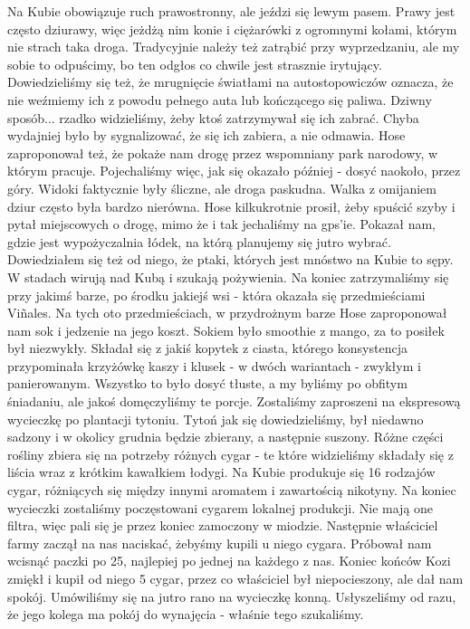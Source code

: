 Na Kubie obowiązuje ruch prawostronny, ale jeździ się lewym pasem.
 Prawy jest często dziurawy, więc jeżdżą nim konie i ciężarówki z ogromnymi kołami, którym nie strach taka droga.
Tradycyjnie należy też zatrąbić przy wyprzedzaniu, ale my sobie to odpuścimy, bo ten odgłos co chwile jest strasznie irytujący.
Dowiedzieliśmy się też, że mrugnięcie światłami na autostopowiczów oznacza, że nie weźmiemy ich z powodu pełnego auta lub kończącego się paliwa.
Dziwny sposób...
rzadko widzieliśmy, żeby ktoś zatrzymywał się ich zabrać.
Chyba wydajniej było by sygnalizować, że się ich zabiera, a nie odmawia.
Hose zaproponował też, że pokaże nam drogę przez wspomniany park narodowy, w którym pracuje.
Pojechaliśmy więc, jak się okazało później - dosyć naokoło, przez góry.
Widoki faktycznie były śliczne, ale droga paskudna.
Walka z omijaniem dziur często była bardzo nierówna.
Hose kilkukrotnie prosił, żeby spuścić szyby i pytał miejscowych o drogę, mimo że i tak jechaliśmy na gps’ie.
Pokazał nam, gdzie jest wypożyczalnia łódek, na którą planujemy się jutro wybrać.
Dowiedziałem się też od niego, że ptaki, których jest mnóstwo na Kubie to sępy.
W stadach wirują nad Kubą i szukają pożywienia.
Na koniec zatrzymaliśmy się przy jakimś barze, po środku jakiejś wsi - która okazała się przedmieściami Viñales.
Na tych oto przedmieściach, w przydrożnym barze Hose zaproponował nam sok i jedzenie na jego koszt.
Sokiem było smoothie z mango, za to posiłek był niezwykły.
Składał się z jakiś kopytek z ciasta, którego konsystencja przypominała krzyżówkę kaszy i klusek - w dwóch wariantach - zwykłym i panierowanym.
Wszystko to było dosyć tłuste, a my byliśmy po obfitym śniadaniu, ale jakoś domęczyliśmy te porcje.
Zostaliśmy zaproszeni na ekspresową wycieczkę po plantacji tytoniu.
Tytoń jak się dowiedzieliśmy, był niedawno sadzony i w okolicy grudnia będzie zbierany, a następnie suszony.
Różne części rośliny zbiera się na potrzeby różnych cygar - te które widzieliśmy składały się z liścia wraz z krótkim kawałkiem łodygi.
Na Kubie produkuje się 16 rodzajów cygar, różniących się między innymi aromatem i zawartością nikotyny.
Na koniec wycieczki zostaliśmy poczęstowani cygarem lokalnej produkcji.
Nie mają one filtra, więc pali się je przez koniec zamoczony w miodzie.
Następnie właściciel farmy zaczął na nas naciskać, żebyśmy kupili u niego cygara.
Próbował nam wcisnąć paczki po 25, najlepiej po jednej na każdego z nas.
Koniec końców Kozi zmiękł i kupił od niego 5 cygar, przez co właściciel był niepocieszony, ale dał nam spokój.
Umówiliśmy się na jutro rano na wycieczkę konną.
Usłyszeliśmy od razu, że jego kolega ma pokój do wynajęcia - właśnie tego szukaliśmy.
